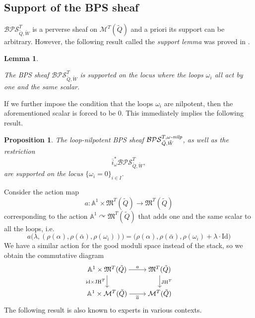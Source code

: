 \documentclass{amsart}
\newtheorem{proposition}[theorem]{Proposition}
\newtheorem{lemma}[theorem]{Lemma}
\DeclareMathOperator{\JH}{\mathrm{JH}}
\def\oi{\overline{i}}
\def\dalpha{\bar{\alpha}}
\begin{document}
\medskip 

\subsection{Support of the BPS sheaf} 
\label{sub:support} 

$\mathcal{BPS}^T_{\tilde{Q},\tilde{W}}$ is a perverse sheaf on $\mathcal{M}^T(\tilde{Q})$ and a priori its support can be arbitrary. However, the following result called the \emph{support lemma} was proved in \cite[Lemma 4.1]{davison2022integrality}.

\medskip 

\begin{lemma}
\label{lem:support}

The BPS sheaf $\mathcal{BPS}^T_{\tilde{Q},\tilde{W}}$ is supported on the locus where the loops $\omega_i$ all act by one and the same scalar. 
\end{lemma}

\medskip 

\noindent If we further impose the condition that the loops $\omega_i$ are nilpotent, then the aforementioned scalar is forced to be 0. This immediately implies the following result.

\medskip 

\begin{proposition}

The loop-nilpotent BPS sheaf $\mathcal{BPS}^{T,\omega\emph{-nilp}}_{\tilde{Q},\tilde{W}}$, as well as the restriction 
$$
\oi^*_{\omega} \mathcal{BPS}^T_{\tilde{Q},\tilde{W}},
$$
are supported on the locus $\{\omega_i=0\}_{i \in I}$.

\end{proposition}

\medskip 

\noindent Consider the action map
\[ 
a:\mathbb{A}^1 \times \mathfrak{M}^T(\tilde{Q}) \rightarrow \mathfrak{M}^T(\tilde{Q}) 
\] 
corresponding to the action $\mathbb{A}^1 \curvearrowright \mathfrak{M}^T(\tilde{Q})$ that adds one and the same scalar to all the loops, i.e.
$$
a\Big(\lambda, (\rho(\alpha), \rho(\dalpha), \rho(\omega_i)) \Big) = \Big(\rho(\alpha), \rho(\dalpha), \rho(\omega_i)+\lambda\cdot \text{Id} \Big)
$$
We have a similar action for the good moduli space instead of the stack, so we obtain the commutative diagram
\[
\begin{tikzcd}[cramped]
	{\mathbb{A}^1 \times \mathfrak{M}^T(\tilde{Q}) } & {\mathfrak{M}^T(\tilde{Q}) } \\
	{\mathbb{A}^1 \times \mathcal{M}^T(\tilde{Q}) } & {\mathcal{M}^T(\tilde{Q}) }
	\arrow["a", from=1-1, to=1-2]
	\arrow["{\mathrm{id} \times \JH^T}"', from=1-1, to=2-1]
	\arrow["\JH^T", from=1-2, to=2-2]
	\arrow["{\overline{a}}"', from=2-1, to=2-2]
\end{tikzcd}
\] 
The following result is also known to experts in various contexts.
\end{document}
